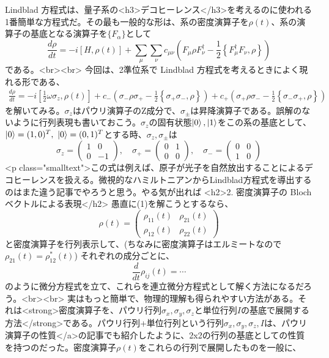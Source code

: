 Lindblad 方程式は、量子系の<h3>デコヒーレンス</h3>を考えるのに使われる1番簡単な方程式だ。その最も一般的な形は、系の密度演算子を\(\rho(t)\)、系の演算子の基底となる演算子を\(\{F_\alpha\}\)として
\[\frac{d\rho}{dt} = -i[H,\rho(t)] + \sum_\mu \sum_\nu c_{\mu\nu}\left(F_\mu\rho F_\nu^\dagger - \frac{1}{2}\left\{F_\mu^\dagger F_\nu , \rho\right\}\right) \]
である。<br><br>
今回は、2準位系で Lindblad 方程式を考えるときによく現れる形である、
\begin{align}
\frac{d\rho}{dt} = -i\left[\frac{1}{2}\omega \sigma_z,\rho(t)\right] +  c_- \left(\sigma_-\rho \sigma_+ - \frac{1}{2}\left\{\sigma_+ \sigma_- , \rho\right\}\right)+  c_+ \left(\sigma_+\rho \sigma_- - \frac{1}{2}\left\{\sigma_- \sigma_+ , \rho\right\}\right)\tag{1}
\end{align}
を解いてみる。\(\sigma_z\)はパウリ演算子のZ成分で、\(\sigma_\pm\)は昇降演算子である。誤解のないように行列表現も書いておこう。\(\sigma_z\)の固有状態\(\ket{0},\ket{1}\)をこの系の基底として、\(\ket{0} = (1,0)^T,~\ket{0} = (0,1)^T\)とする時、\(\sigma_z,\sigma_\pm\)は
\[\sigma_z = \left(\begin{array}{cc}1&0\\0&-1\end{array}\right),\quad\sigma_+ = \left(\begin{array}{cc}0&1\\0&0\end{array}\right),\quad\sigma_- = \left(\begin{array}{cc}0&0\\1&0\end{array}\right)\]
<p class="smalltext">この式は例えば、原子が光子を自然放出することによるデコヒーレンスを扱える。微視的なハミルトニアンからLindblad方程式を導出するのはまた違う記事でやろうと思う。やる気が出れば
<h2>2. 密度演算子の Bloch ベクトルによる表現</h2>
愚直に(1)を解こうとするなら、
\[\rho(t) = \left(\begin{array}{cc}\rho_{11}(t)&\rho_{21}(t)\\\rho_{12}(t)&\rho_{22}(t)\end{array}\right)\]
と密度演算子を行列表示して、(ちなみに密度演算子はエルミートなので\(\rho_{21}(t) = \rho_{12}^*(t)\)) それぞれの成分ごとに、
\[\frac{d}{dt}\rho_{ij}(t) = \cdots\]
のように微分方程式を立て、これらを連立微分方程式として解く方法になるだろう。<br><br>
実はもっと簡単で、物理的理解も得られやすい方法がある。それは<strong>密度演算子を、パウリ行列\(\sigma_x,\sigma_y,\sigma_z\)と単位行列\(I\)の基底で展開する方法</strong>である。パウリ行列+単位行列という行列\(\sigma_x,\sigma_y,\sigma_z,I\)は、パウリ演算子の性質</a>の記事でも紹介したように、2x2の行列の基底としての性質を持つのだった。密度演算子\(\rho(t)\)をこれらの行列で展開したものを一般に、
